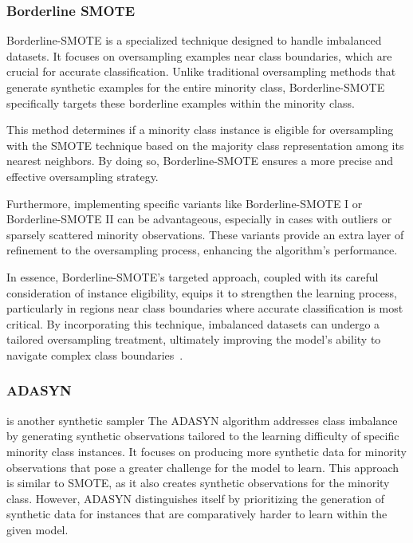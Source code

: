 \subsubsection{Borderline SMOTE}

Borderline-SMOTE is a specialized technique designed to handle imbalanced datasets. It focuses on oversampling examples near class boundaries, which are crucial for accurate classification. Unlike traditional oversampling methods that generate synthetic examples for the entire minority class, Borderline-SMOTE specifically targets these borderline examples within the minority class.

This method determines if a minority class instance is eligible for oversampling with the SMOTE technique based on the majority class representation among its nearest neighbors. By doing so, Borderline-SMOTE ensures a more precise and effective oversampling strategy.

Furthermore, implementing specific variants like Borderline-SMOTE I or Borderline-SMOTE II can be advantageous, especially in cases with outliers or sparsely scattered minority observations. These variants provide an extra layer of refinement to the oversampling process, enhancing the algorithm's performance.

In essence, Borderline-SMOTE's targeted approach, coupled with its careful consideration of instance eligibility, equips it to strengthen the learning process, particularly in regions near class boundaries where accurate classification is most critical. By incorporating this technique, imbalanced datasets can undergo a tailored oversampling treatment, ultimately improving the model's ability to navigate complex class boundaries~\cite{Nguyen2009,Gupta2018,Brandt2020}.




\subsubsection{ADASYN} is another synthetic sampler 
The ADASYN algorithm addresses class imbalance by generating synthetic observations tailored to the learning difficulty of specific minority class instances. It focuses on producing more synthetic data for minority observations that pose a greater challenge for the model to learn. This approach is similar to SMOTE, as it also creates synthetic observations for the minority class. However, ADASYN distinguishes itself by prioritizing the generation of synthetic data for instances that are comparatively harder to learn within the given model.


